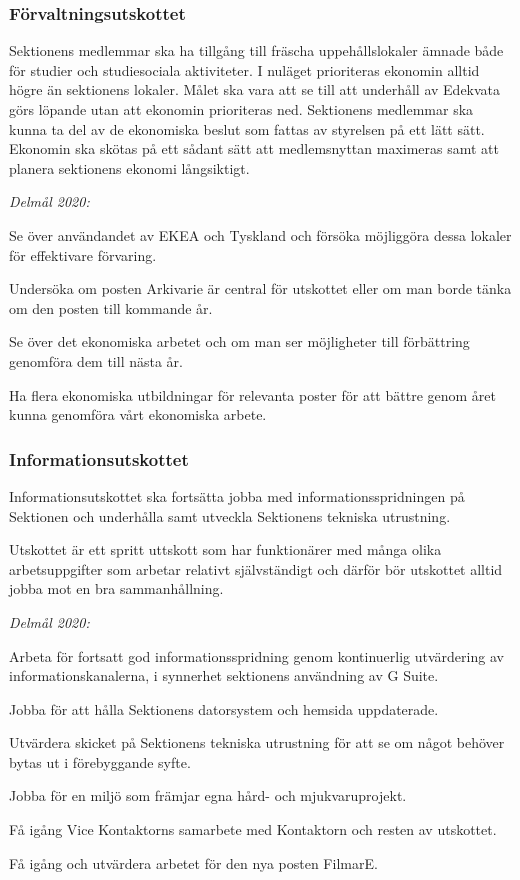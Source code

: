 \documentclass[../_main/handlingar.tex]{subfiles}
\begin{document}
\subsubsection*{Förvaltningsutskottet}

Sektionens medlemmar ska ha tillgång till fräscha uppehållslokaler ämnade både för studier och studiesociala aktiviteter. I nuläget prioriteras ekonomin alltid högre än sektionens lokaler. Målet ska vara att se till att underhåll av Edekvata görs löpande utan att ekonomin prioriteras ned. Sektionens medlemmar ska kunna ta del av de ekonomiska beslut som fattas av styrelsen på ett lätt sätt. Ekonomin ska skötas på ett sådant sätt att medlemsnyttan maximeras samt att planera sektionens ekonomi långsiktigt.


\emph{Delmål 2020:}
\begin{dashlist}
	\item Se över användandet av EKEA och Tyskland och försöka möjliggöra dessa lokaler för effektivare förvaring.
	\item Undersöka om posten Arkivarie är central för utskottet eller om man borde tänka om den posten till kommande år.
	\item Se över det ekonomiska arbetet och om man ser möjligheter till förbättring genomföra dem till nästa år.
	\item Ha flera ekonomiska utbildningar för relevanta poster för att bättre genom året kunna genomföra vårt ekonomiska arbete.
\end{dashlist}

\newpage

\subsubsection*{Informationsutskottet}
Informationsutskottet ska fortsätta jobba med informationsspridningen på Sektionen och underhålla samt utveckla Sektionens tekniska utrustning. 
 
Utskottet är ett spritt uttskott som har funktionärer med många olika arbetsuppgifter som arbetar relativt självständigt och därför bör utskottet alltid jobba mot en bra sammanhållning.

\emph{Delmål 2020:}
\begin{dashlist}
	\item Arbeta för fortsatt god informationsspridning genom kontinuerlig utvärdering av informationskanalerna, i synnerhet sektionens användning av G Suite. 
	\item Jobba för att hålla Sektionens datorsystem och hemsida uppdaterade.
	\item Utvärdera skicket på Sektionens tekniska utrustning för att se om något behöver bytas ut i förebyggande syfte.
	\item Jobba för en miljö som främjar egna hård- och mjukvaruprojekt. 
	\item Få igång Vice Kontaktorns samarbete med Kontaktorn och resten av utskottet.
	\item Få igång och utvärdera arbetet för den nya posten FilmarE.
\end{dashlist}
\end{document}
